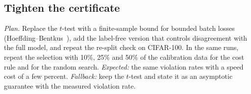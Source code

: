 \begin{table}[ht]
  \centering\footnotesize\setlength{\tabcolsep}{4pt}
  
  \caption{QQP, RTX A6000, eager PyTorch: measured speedup of each method's certified policy on held-out inputs
  (2{,}048 per pass, 5 rounds, median paired speedup). Decisions of the trained RoBERTa-base model replayed on a
  random-weight fp32 network. Bold: fastest policy within the one-point budget in the column. $^{*}$ held-out drop
  above one point. File: .}
  \label{tab:t11}
\end{table}

\begin{table}[ht]
  \centering\footnotesize\setlength{\tabcolsep}{4pt}
  
  \caption{MNLI, same layout. File: .}
  \label{tab:t12}
\end{table}

\begin{table}[ht]
  \centering\footnotesize
  
  \caption{CIFAR-100, ViT-B/16 (197 tokens), RTX A6000, same protocol, timed only at $B=8$ (eager): the 25 November
  run stopped during $B=16$. File: .}
  \label{tab:t12b}
\end{table}

\subsection{Tighten the certificate}\label{sec:tighten}
\textit{Plan.} Replace the $t$-test with a finite-sample bound for bounded batch losses (Hoeffding--Bentkus~\cite{rcps}), add
the label-free version that controls disagreement with the full model, and repeat the re-split check on CIFAR-100.
In the same runs, repeat the selection with 10\%, 25\% and 50\% of the calibration data for the cost rule and for
the random search. \textit{Expected:} the same violation rates with a speed cost of a few percent.
\textit{Fallback:} keep the $t$-test and state it as an asymptotic guarantee with the measured violation rate.


